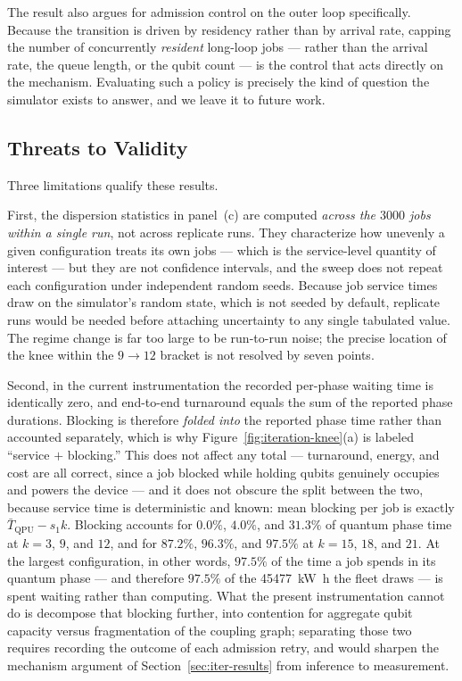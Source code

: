 The result also argues for admission control on the outer loop specifically.
Because the transition is driven by residency rather than by arrival rate,
capping the number of concurrently \emph{resident} long-loop jobs --- rather
than the arrival rate, the queue length, or the qubit count --- is the control
that acts directly on the mechanism. Evaluating such a policy is precisely the
kind of question the simulator exists to answer, and we leave it to future
work.

\subsection{Threats to Validity}
\label{sec:iter-validity}

Three limitations qualify these results.

First, the dispersion statistics in panel~(c) are computed \emph{across the
$3000$ jobs within a single run}, not across replicate runs. They characterize
how unevenly a given configuration treats its own jobs --- which is the
service-level quantity of interest --- but they are not confidence intervals,
and the sweep does not repeat each configuration under independent random
seeds. Because job service times draw on the simulator's random state, which is
not seeded by default, replicate runs would be needed before attaching
uncertainty to any single tabulated value. The regime change is far too large
to be run-to-run noise; the precise location of the knee within the
$9 \rightarrow 12$ bracket is not resolved by seven points.

Second, in the current instrumentation the recorded per-phase waiting time is
identically zero, and end-to-end turnaround equals the sum of the reported
phase durations. Blocking is therefore \emph{folded into} the reported phase
time rather than accounted separately, which is why
Figure~\ref{fig:iteration-knee}(a) is labeled ``service $+$ blocking.'' This
does not affect any total --- turnaround, energy, and cost are all correct,
since a job blocked while holding qubits genuinely occupies and powers the
device --- and it does not obscure the split between the two, because service
time is deterministic and known: mean blocking per job is exactly
$\bar{T}_{\mathrm{QPU}} - s_1 k$. Blocking accounts for $0.0\%$, $4.0\%$, and
$31.3\%$ of quantum phase time at $k=3$, $9$, and $12$, and for $87.2\%$,
$96.3\%$, and $97.5\%$ at $k=15$, $18$, and $21$. At the largest configuration,
in other words, $97.5\%$ of the time a job spends in its quantum phase --- and
therefore $97.5\%$ of the \qty{45477}{\kilo\watt\hour} the fleet draws --- is
spent waiting rather than computing. What the present instrumentation cannot do
is decompose that blocking further, into contention for aggregate qubit
capacity versus fragmentation of the coupling graph; separating those two
requires recording the outcome of each admission retry, and would sharpen the
mechanism argument of Section~\ref{sec:iter-results} from inference to
measurement.

